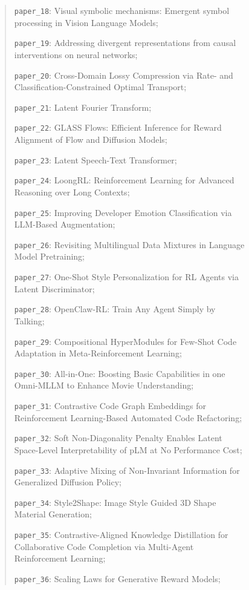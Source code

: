 \documentclass{llmxive}
\begin{document}
\begin{figure}[!htbp]
{\begin{quote}
    \texttt{paper\_18}: Visual symbolic mechanisms: Emergent symbol processing in Vision Language Models;\par
    \texttt{paper\_19}: Addressing divergent representations from causal interventions on neural networks;\par
    \texttt{paper\_20}: Cross-Domain Lossy Compression via Rate- and Classification-Constrained Optimal Transport;\par
    \texttt{paper\_21}: Latent Fourier Transform;\par
    \texttt{paper\_22}: GLASS Flows: Efficient Inference for Reward Alignment of Flow and Diffusion Models;\par
    \texttt{paper\_23}: Latent Speech-Text Transformer;\par
    \texttt{paper\_24}: LoongRL: Reinforcement Learning for Advanced Reasoning over Long Contexts;\par
    \texttt{paper\_25}: Improving Developer Emotion Classification via LLM-Based Augmentation;\par
    \texttt{paper\_26}: Revisiting Multilingual Data Mixtures in Language Model Pretraining;\par
    \texttt{paper\_27}: One-Shot Style Personalization for RL Agents via Latent Discriminator;\par
    \texttt{paper\_28}: OpenClaw-RL: Train Any Agent Simply by Talking;\par
    \texttt{paper\_29}: Compositional HyperModules for Few-Shot Code Adaptation in Meta-Reinforcement Learning;\par
    \texttt{paper\_30}: All-in-One: Boosting Basic Capabilities in one Omni-MLLM to Enhance Movie Understanding;\par
    \texttt{paper\_31}: Contrastive Code Graph Embeddings for Reinforcement Learning-Based Automated Code Refactoring;\par
    \texttt{paper\_32}: Soft Non-Diagonality Penalty Enables Latent Space-Level Interpretability of pLM at No Performance Cost;\par
    \texttt{paper\_33}: Adaptive Mixing of Non-Invariant Information for Generalized Diffusion Policy;\par
    \texttt{paper\_34}: Style2Shape: Image Style Guided 3D Shape Material Generation;\par
    \texttt{paper\_35}: Contrastive-Aligned Knowledge Distillation for Collaborative Code Completion via Multi-Agent Reinforcement Learning;\par
    \texttt{paper\_36}: Scaling Laws for Generative Reward Models;\par

\end{quote}}
\end{figure}
\end{document}

